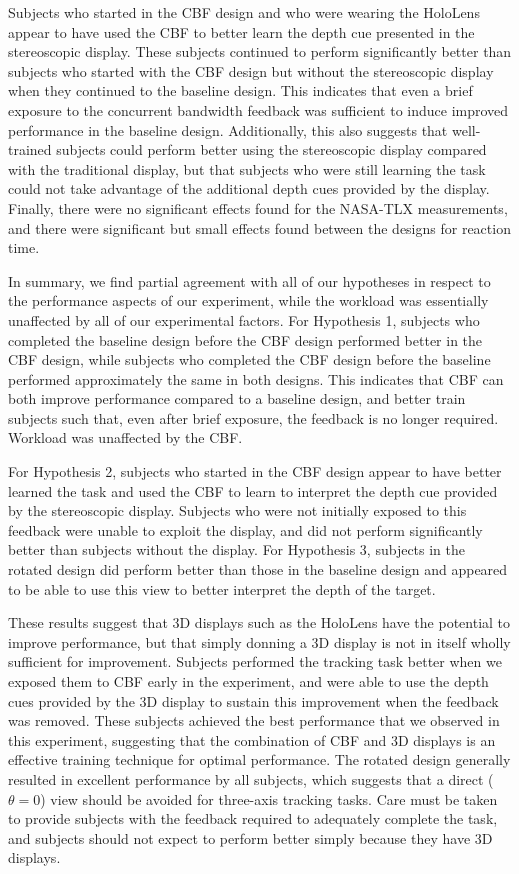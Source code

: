 Subjects who started in the CBF design and who were wearing the HoloLens appear to have used the CBF to better learn the depth cue presented in the stereoscopic display.
These subjects continued to perform significantly better than subjects who started with the CBF design but without the stereoscopic display when they continued to the baseline design.
This indicates that even a brief exposure to the concurrent bandwidth feedback was sufficient to induce improved performance in the baseline design.
Additionally, this also suggests that well-trained subjects could perform better using the stereoscopic display compared with the traditional display, but that subjects who were still learning the task could not take advantage of the additional depth cues provided by the display.
Finally, there were no significant effects found for the NASA-TLX measurements, and there were significant but small effects found between the designs for reaction time.

In summary, we find partial agreement with all of our hypotheses in respect to the performance aspects of our experiment, while the workload was essentially unaffected by all of our experimental factors.
For Hypothesis 1, subjects who completed the baseline design before the CBF design performed better in the CBF design, while subjects who completed the CBF design before the baseline performed approximately the same in both designs.
This indicates that CBF can both improve performance compared to a baseline design, and better train subjects such that, even after brief exposure, the feedback is no longer required.
Workload was unaffected by the CBF.

For Hypothesis 2, subjects who started in the CBF design appear to have better learned the task and used the CBF to learn to interpret the depth cue provided by the stereoscopic display.
Subjects who were not initially exposed to this feedback were unable to exploit the display, and did not perform significantly better than subjects without the display.
For Hypothesis 3, subjects in the rotated design did perform better than those in the baseline design and appeared to be able to use this view to better interpret the depth of the target.

These results suggest that 3D displays such as the HoloLens have the potential to improve performance, but that simply donning a 3D display is not in itself wholly sufficient for improvement.
Subjects performed the tracking task better when we exposed them to CBF early in the experiment, and were able to use the depth cues provided by the 3D display to sustain this improvement when the feedback was removed.
These subjects achieved the best performance that we observed in this experiment, suggesting that the combination of CBF and 3D displays is an effective training technique for optimal performance.
The rotated design generally resulted in excellent performance by all subjects, which suggests that a direct ($\theta=0$) view should be avoided for three-axis tracking tasks.
Care must be taken to provide subjects with the feedback required to adequately complete the task, and subjects should not expect to perform better simply because they have 3D displays.

